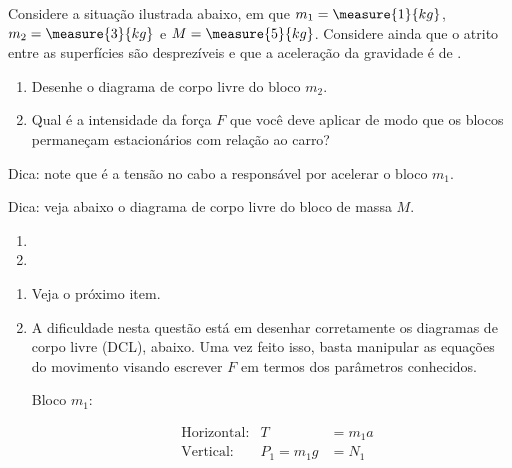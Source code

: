 \begin{question}
	Considere a situação ilustrada abaixo, em que $m_1 = \measure{1}{kg}$, $m_2 = \measure{3}{kg}$ e $M = \measure{5}{kg}$.
	Considere ainda que o atrito entre as superfícies são desprezíveis e que a aceleração da gravidade é de .


	\begin{enumerate}
		\item Desenhe o diagrama de corpo livre do bloco $m_2$.
		\item Qual é a intensidade da força $F$ que você deve aplicar de modo que os blocos permaneçam estacionários com relação ao carro?
	\end{enumerate}
	\begin{compactdesc}
		\item[Dica:] note que é a tensão no cabo a responsável por acelerar o bloco $m_1$.
		\item[Dica:] veja abaixo o diagrama de corpo livre do bloco de massa $M$.

	\end{compactdesc}

	\begin{answer}
		\begin{enumerate}
			\item \raisebox{-\height}{\texttt{[image: 20181029\_214000]}}
			\item {}
		\end{enumerate}
	\end{answer}

	\begin{solution}
		\begin{enumerate}
			\item Veja o próximo item.
			\item A dificuldade nesta questão está em desenhar corretamente os diagramas de corpo livre (DCL), abaixo.
			Uma vez feito isso, basta manipular as equações do movimento visando escrever $F$ em termos dos parâmetros conhecidos.
		
			\smallskip

			\begin{minipage}[t]{0.3\textwidth}
				\noindent
				Bloco $m_1$:


				\begin{align}
					&\text{Horizontal:}& T &= m_1 a \label{eq:m1x}\\
					&\text{Vertical:}& P_1 = m_1 g &= N_1 \label{eq:m1y}
				\end{align}


\end{minipage}
\end{enumerate}
\end{solution}
\end{question}
